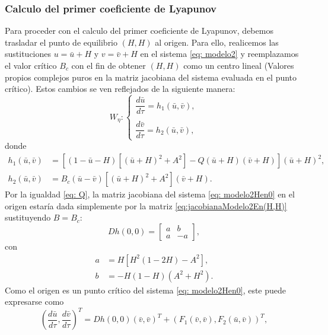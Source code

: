 \subsubsection{Calculo del primer coeficiente de Lyapunov}
Para proceder con el calculo del primer coeficiente de Lyapunov, debemos trasladar el punto de equilibrio $(H, H)$ al origen. Para ello, realicemos las sustituciones $u = \bar{u} + H$ y $v = \bar{v} + H$ en el sistema \eqref{eq: modelo2} y reemplazamos el valor crítico $B_c$ con el fin de obtener $(H,H)$ como un centro lineal (Valores propios complejos puros en la matriz jacobiana del sistema evaluada en el punto crítico). Estos cambios se ven reflejados de la siguiente manera:
\begin{equation}
	W_{\eta}:
	\begin{cases}
		\dfrac{d\bar{u}}{d \tau} = h_1(\bar{u}, \bar{v}), \\ \\
		\dfrac{d\bar{v}}{d \tau} = h_2(\bar{u}, \bar{v}),
	\end{cases}
	\label{eq: modelo2Hen0}
\end{equation}
donde
\begin{equation*}
	\begin{aligned}
		h_1(\bar{u}, \bar{v}) &= [(1 - \bar{u} - H)[(\bar{u} + H)^{2} + A^{2}] - Q (\bar{u} + H) (\bar{v} + H)](\bar{u} + H)^{2}, \\
		h_2(\bar{u}, \bar{v}) &= B_c(\bar{u} - \bar{v})[(\bar{u} + H)^{2} + A^{2}](\bar{v} + H).
	\end{aligned}
\end{equation*}
Por la igualdad \eqref{eq: Q}, la matriz jacobiana del sistema \eqref{eq: modelo2Hen0} en el origen estaría dada simplemente por la matriz \eqref{eq:jacobianaModelo2En(H,H)} sustituyendo $B=B_c$:
\begin{equation}
	Dh(0,0) =
	\begin{bmatrix}
	a & b \\
	a & - a
	\end{bmatrix},
	\label{eq:jacobianamodelo2Hen0}
\end{equation}
con
\begin{equation*}
	\begin{aligned}
		a &= H[H^{2}(1-2H)-A^2], \\
		b &= -H(1-H)(A^2+H^2).
	\end{aligned}
\end{equation*}
Como el origen es un punto crítico del sistema \eqref{eq: modelo2Hen0}, este puede expresarse como
\begin{equation}
	\left(\dfrac{d\bar{u}}{d \tau}, \dfrac{d\bar{v}}{d \tau}\right)^T=Dh(0,0)(\bar{v},\bar{v})^T+(F_1(\bar{v},\bar{v}), F_2(\bar{u},\bar{v}))^T,
	\label{eq: sistemal1}
\end{equation}
